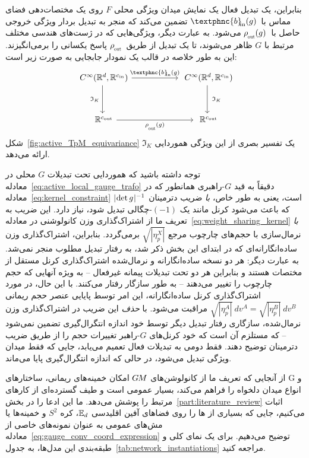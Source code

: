 بنابراین، یک تبدیل فعال یک نمایش میدان ویژگی محلی $F$ روی یک مختصات‌دهی فضای مماس با~$\textphnc{b}_{\mkern-5mu\textup{in}}(g)$ تضمین می‌کند که منجر به تبدیل بردار ویژگی خروجی حاصل با~$\rhoout(g)$ می‌شود.
به عبارت دیگر، ویژگی‌هایی که در ژست‌های هندسی مختلف مرتبط با $G$ ظاهر می‌شوند، تا یک تبدیل از طریق~$\rhoout$ پاسخ یکسانی را برمی‌انگیزند.
این به طور خلاصه در قالب یک نمودار جابجایی به صورت زیر است:
\begin{equation}\label{cd:}
	\begin{tikzcd}[column sep=56pt, row sep=34pt, font=\normalsize]
		C^\infty(\R^d,\R^{\cin})
		\arrow[d, "\mathfrak{I}_K\,"']
		\arrow[r, "\textphnc{b}_{\mkern-5mu\textup{in}}(g)"]
		&
		C^\infty(\R^d,\R^{\cin})
		\arrow[d, "\ \mathfrak{I}_K"]
		\\
		\R^{\cout}
		\arrow[r, "\rhoout(g)"']
		&
		\R^{\cout}
	\end{tikzcd}
\end{equation}
شکل~\ref{fig:active_TpM_equivariance} یک تفسیر بصری از این ویژگی هموردایی $\mathfrak{I}_K$ ارائه می‌دهد.


توجه داشته باشید که هموردایی تحت تبدیلات $G$ محلی در معادله~\eqref{eq:active_local_gauge_trafo} دقیقاً به قید $G$-راهبری همانطور که در معادله~\eqref{eq:kernel_constraint} است، یعنی به طور خاص، \emph{با} ضریب دترمینان $|\mkern-2mu \det g \mkern1mu|^{-1}$ که باعث می‌شود کرنل مانند یک $(-1)$-چگالی تبدیل شود، نیاز دارد.
این ضریب به تعریف ما از اشتراک‌گذاری وزن کانولوشنی در معادله~\eqref{eq:weight_sharing_kernel} \emph{با} نرمال‌سازی با حجم‌های چارچوب مرجع $\sqrt{|\eta_p^X|}$ برمی‌گردد.
بنابراین، اشتراک‌گذاری وزن ساده‌انگارانه‌ای که در ابتدای این بخش ذکر شد، به رفتار تبدیل مطلوب منجر نمی‌شد.
به عبارت دیگر: هر دو نسخه ساده‌انگارانه و نرمال‌شده اشتراک‌گذاری کرنل مستقل از مختصات هستند و بنابراین هر دو تحت تبدیلات پیمانه غیرفعال -- به ویژه آنهایی که حجم چارچوب را تغییر می‌دهند -- به طور سازگار رفتار می‌کنند.
با این حال، در مورد اشتراک‌گذاری کرنل ساده‌انگارانه، این امر توسط پایایی عنصر حجم ریمانی $\sqrt{|\eta_p^A|}\ dv^A = \sqrt{|\eta_p^B|}\ dv^B$ مراقبت می‌شود.
با \emph{حذف} این ضریب در اشتراک‌گذاری وزن نرمال‌شده، سازگاری رفتار تبدیل دیگر توسط خود اندازه انتگرال‌گیری تضمین نمی‌شود -- که مستلزم آن است که خود کرنل‌های $G$-راهبر تغییرات حجم را از طریق ضریب دترمینان توضیح دهند.
فقط دومی به تبدیلات فعال تعمیم می‌یابد، جایی که فقط میدان ویژگی تبدیل می‌شود، در حالی که اندازه انتگرال‌گیری پایا می‌ماند.


از آنجایی که تعریف ما از کانولوشن‌های $G\mkern-1.4muM$ امکان خمینه‌های ریمانی، ساختارهای G و انواع میدان دلخواه را فراهم می‌کند، بسیار عمومی است و طیف گسترده‌ای از کارهای مرتبط را پوشش می‌دهد.
ما این ادعا را در بخش~\ref{part:literature_review} اثبات می‌کنیم، جایی که بسیاری از \cnn{}ها را روی فضاهای آفین اقلیدسی $\mathbb{E}_d$، کره $S^2$ و خمینه‌ها یا مش‌های عمومی به عنوان نمونه‌های خاصی از معادله~\eqref{eq:gauge_conv_coord_expression} توضیح می‌دهیم.
برای یک نمای کلی و طبقه‌بندی این مدل‌ها، به جدول~\ref{tab:network_instantiations} مراجعه کنید.